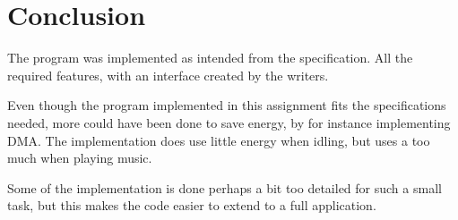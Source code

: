 \section{Conclusion}
The program was implemented as intended from the specification. All the required features, with an interface created by the writers.

Even though the program implemented in this assignment fits the specifications needed, more could have been done to save energy, by for instance implementing DMA.
The implementation does use little energy when idling, but uses a too much when playing music.

Some of the implementation is done perhaps a bit too detailed for such a small task, but this makes the code easier to extend to a full application.

